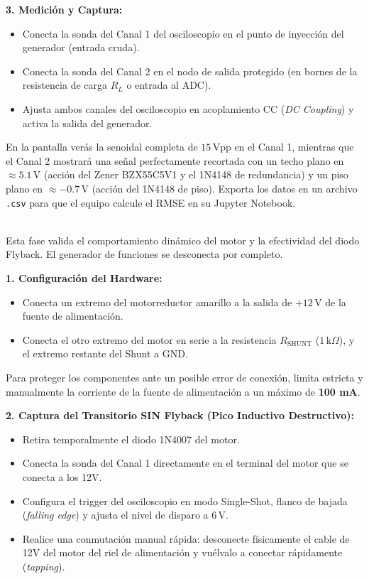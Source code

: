 \documentclass[11pt, a4paper]{article}
\newcommand{\phase}[1]{\vspace{0.4cm}\noindent\colorbox{ucbblue}{\textcolor{white}{\textbf{\large #1}}}\vspace{0.2cm}}
\newcommand{\subphase}[1]{\vspace{0.2cm}\noindent\textbf{\textcolor{ucbblue}{#1}}\vspace{0.1cm}}
\begin{document}
\subphase{3. Medición y Captura:}
\begin{itemize}[leftmargin=*]
    \item Conecta la sonda del Canal 1 del osciloscopio en el punto de inyección del generador (entrada cruda).
    \item Conecta la sonda del Canal 2 en el nodo de salida protegido (en bornes de la resistencia de carga $R_L$ o entrada al ADC).
    \item Ajusta ambos canales del osciloscopio en acoplamiento CC (\textit{DC Coupling}) y activa la salida del generador.
\end{itemize}

\begin{expected}
En la pantalla verás la senoidal completa de $15\,\text{Vpp}$ en el Canal 1, mientras que el Canal 2 mostrará una señal perfectamente recortada con un techo plano en $\approx 5.1\,\text{V}$ (acción del Zener BZX55C5V1 y el 1N4148 de redundancia) y un piso plano en $\approx -0.7\,\text{V}$ (acción del 1N4148 de piso). Exporta los datos en un archivo \texttt{.csv} para que el equipo calcule el RMSE en su Jupyter Notebook.
\end{expected}

\vspace{0.2cm}
\phase{Fase 2: Verificación de la Planta de Potencia y Supresión Inductiva}
Esta fase valida el comportamiento dinámico del motor y la efectividad del diodo Flyback. El generador de funciones se desconecta por completo.

\subphase{1. Configuración del Hardware:}
\begin{itemize}[leftmargin=*]
    \item Conecta un extremo del motorreductor amarillo a la salida de $+12\,\text{V}$ de la fuente de alimentación.
    \item Conecta el otro extremo del motor en serie a la resistencia $R_{\text{SHUNT}}$ ($1\,\text{k}\Omega$), y el extremo restante del Shunt a GND.
\end{itemize}
\begin{tcolorbox}[colback=warningred, colframe=warningborder, title=\textbf{Nota de Seguridad:}]
Para proteger los componentes ante un posible error de conexión, limita estricta y manualmente la corriente de la fuente de alimentación a un máximo de \textbf{100 mA}.
\end{tcolorbox}

\subphase{2. Captura del Transitorio SIN Flyback (Pico Inductivo Destructivo):}
\begin{itemize}[leftmargin=*]
    \item Retira temporalmente el diodo 1N4007 del motor.
    \item Conecta la sonda del Canal 1 directamente en el terminal del motor que se conecta a los 12V.
    \item Configura el trigger del osciloscopio en modo Single-Shot, flanco de bajada (\textit{falling edge}) y ajusta el nivel de disparo a $6\,\text{V}$.
    \item Realice una conmutación manual rápida: desconecte físicamente el cable de 12V del motor del riel de alimentación y vuélvalo a conectar rápidamente (\textit{tapping}).
\end{itemize}
\end{document}
